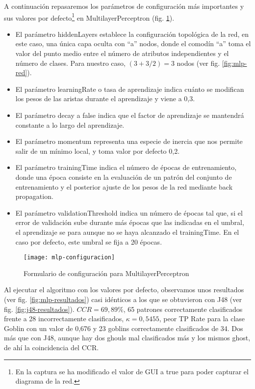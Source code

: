 A continuación repasaremos los parámetros de configuración más importantes y sus valores por defecto\footnote{En la captura se ha modificado el valor de GUI a true para poder capturar el diagrama de la red.} en MultilayerPerceptron (fig. \ref{fig:mlp-configuracion}). 
\begin{itemize}
    \item El parámetro hiddenLayers establece la configuración topológica de la red, en este caso, una única capa oculta con ``a'' nodos, donde el comodín ``a'' toma el valor del punto medio entre el número de atributos independientes y el número de clases. Para nuestro caso, $(3+3/2)=3$ nodos (ver fig. \ref{fig:mlp-red}).
    \item El parámetro learningRate o tasa de aprendizaje indica cuánto se modifican los pesos de las aristas durante el aprendizaje y viene a 0,3.
    \item El parámetro decay a false indica que el factor de aprendizaje se mantendrá constante a lo largo del aprendizaje.
    \item El parámetro momentum representa una especie de inercia que nos permite salir de un mínimo local, y toma valor por defecto 0,2. 
    \item  El parámetro trainingTime indica el número de épocas de entrenamiento, donde una época consiste en la evaluación de un patrón del conjunto de entrenamiento y el posterior ajuste de los pesos de la red mediante back propagation.
    \item El parámetro validationThreshold indica un número de épocas tal que, si el error de validación sube durante más épocas que las indicadas en el umbral, el aprendizaje se para aunque no se haya alcanzado el trainingTime. En el caso por defecto, este umbral se fija a 20 épocas.
\end{itemize}


\begin{figure}[ht]
    \centering
    \texttt{[image: mlp-configuracion]}
    \caption{Formulario de configuración para MultilayerPerceptron}
    \label{fig:mlp-configuracion}
\end{figure}

Al ejecutar el algoritmo con los valores por defecto, observamos unos resultados (ver fig. \ref{fig:mlp-resultados}) casi idénticos a los que se obtuvieron con J48 (ver fig. \ref{fig:j48-resultados}). $CCR=69,89\%$, 65 patrones correctamente clasificados frente a 28 incorrectamente clasificados, $\kappa=0,5455$, peor TP Rate para la clase Goblin con un valor de 0,676 y 23 goblins correctamente clasificados de 34. Dos más que con J48, aunque hay dos ghouls mal clasificados más y los mismos ghost, de ahí la coincidencia del CCR.


